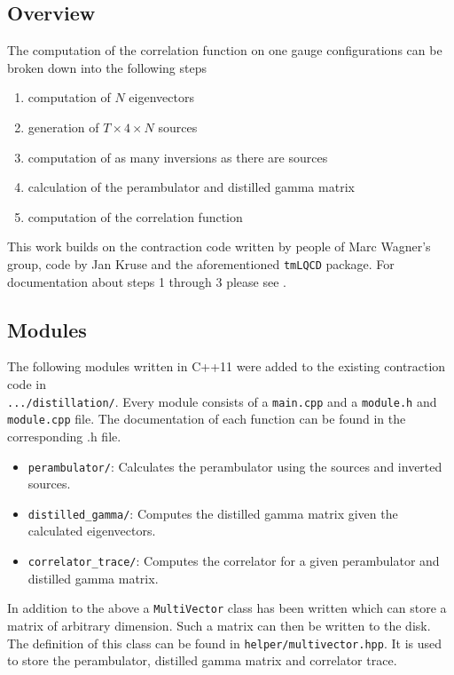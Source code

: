 \subsection{Overview}
    The computation of the correlation function on one gauge configurations can be broken down into the following steps
    \begin{enumerate}
        \item computation of $N$ eigenvectors
        \item generation of $T \times 4 \times N$ sources
        \item computation of as many inversions as there are sources
        \item calculation of the perambulator and distilled gamma matrix
        \item computation of the correlation function
    \end{enumerate}
    This work builds on the contraction code written by people of Marc Wagner's group, code by Jan Kruse and the aforementioned \verb+tmLQCD+ package. For documentation about steps 1 through 3 please see \cite{bachelor_thesis_jan}.



\subsection{Modules}
    The following modules written in C++11 were added to the existing contraction code in \\\verb+.../distillation/+. Every module consists of a \verb+main.cpp+ and a \verb+module.h+ and \verb+module.cpp+ file. The documentation of each function can be found in the corresponding .h file.  
    \begin{itemize}
        \item \verb+perambulator/+: Calculates the perambulator using the sources and inverted sources.
        \item \verb+distilled_gamma/+: Computes the distilled gamma matrix given the calculated eigenvectors.
        \item \verb+correlator_trace/+: Computes the correlator for a given perambulator and distilled gamma matrix.
    \end{itemize}
    
    In addition to the above a \verb+MultiVector+ class has been written which can store a matrix of arbitrary dimension. Such a matrix can then be written to the disk. The definition of this class can be found in \verb+helper/multivector.hpp+. It is used to store the perambulator, distilled gamma matrix and correlator trace.
    
